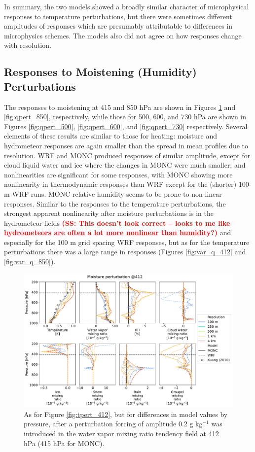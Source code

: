 \documentclass[draft]{agujournal2019}
\newcommand{\todo}[1]{\textcolor{red}{\textbf{(#1)}}}
\begin{document}
In summary, the two models showed a broadly similar character of microphysical
responses to temperature perturbations, but there were sometimes different
amplitudes of responses which are presumably attributable to differences in
microphysics schemes. The models also did not agree on how responses change with
resolution.

\subsection{Responses to Moistening (Humidity) Perturbations}

The responses to moistening at 415 and 850 hPa are
shown in Figures \ref{fig:qpert_412} and \ref{fig:qpert_850}, respectively,
while those for 500, 600, and 730 hPa are shown in Figures
\ref{fig:qpert_500}, \ref{fig:qpert_600}, and \ref{fig:qpert_730} respectively.
Several elements of these results are similar to those for heating: moisture and hydrometeor responses are
again smaller than the spread in mean profiles due to resolution. WRF
and MONC produced responses of similar amplitude, except for cloud liquid water
and ice where the changes in MONC were much smaller; and nonlinearities are significant for some responses, with MONC showing more
nonlinearity in thermodynamic responses than
WRF except for the (shorter) 100-m WRF runs. MONC relative humidity seems to be prone to non-linear responses. Similar to the responses to the
temperature perturbations, the strongest apparent nonlinearity after moisture
perturbations is in the hydrometeor fields \todo{SS: This doesn't look correct -- looks to me like hydrometeors are often a lot more nonlinear than humidity?} and especially for the 100 m grid
spacing WRF responses, but as for the temperature perturbations there was a
large range in responses (Figures \ref{fig:var_q_412} and \ref{fig:var_q_850}).

\begin{figure}[pth]
    \noindent\includegraphics[width=\textwidth]{figures/pert_diffs_q_0.0002_@412}
    \caption{As for Figure \ref{fig:tpert_412}, but for differences in model
    values by pressure, after a perturbation forcing of amplitude 0.2 g
    kg$^{-1}$ was introduced in the water vapor mixing ratio tendency field at
    412 hPa (415 hPa for MONC).}
    \label{fig:qpert_412}
\end{figure}
\end{document}
